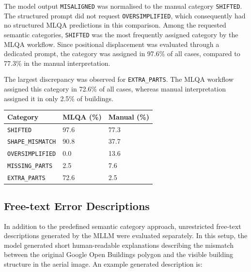 The model output \texttt{MISALIGNED} was normalised to the manual category \texttt{SHIFTED}. The structured prompt did not request \texttt{OVERSIMPLIFIED}, which consequently had no structured MLQA predictions in this comparison. Among the requested semantic categories, \texttt{SHIFTED} was the most frequently assigned category by the MLQA workflow. Since positional displacement was evaluated through a dedicated prompt, the category was assigned in 97.6\% of all cases, compared to 77.3\% in the manual interpretation.

The largest discrepancy was observed for \texttt{EXTRA\_PARTS}. The MLQA workflow assigned this category in 72.6\% of all cases, whereas manual interpretation assigned it in only 2.5\% of buildings.


\begin{table}[htp]
	\begin{center}
		\begin{tabular}{lll}
			\toprule
			\textbf{Category} & \textbf{MLQA (\%)} & \textbf{Manual (\%)} \\
			\midrule
			\texttt{SHIFTED} & 97.6 & 77.3 \\
			\texttt{SHAPE\_MISMATCH} & 90.8 & 37.7 \\
			\texttt{OVERSIMPLIFIED} & 0.0 & 13.6 \\
			\texttt{MISSING\_PARTS} & 2.5 & 7.6 \\
			\texttt{EXTRA\_PARTS} & 72.6 & 2.5 \\
			\bottomrule
		\end{tabular}
		\label{tab:semantic_category_comparison}
	\end{center}
\end{table}

\subsection{Free-text Error Descriptions}
\label{sec:results_free_text_descriptions}

In addition to the predefined semantic category approach, unrestricted free-text descriptions generated by the MLLM were evaluated separately. In this setup, the model generated short human-readable explanations describing the mismatch between the original Google Open Buildings polygon and the visible building structure in the aerial image. An example generated description is:

